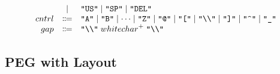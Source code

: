 \begin{align*}
\begin{array}{rcl}
    \\
    & \mid & \text{\texttt{\textquotedbl US\textquotedbl}}
    \mid \text{\texttt{\textquotedbl SP\textquotedbl}}
    \mid \text{\texttt{\textquotedbl DEL\textquotedbl}}
    \\
    {cntrl}
    & \Coloneq & \text{\texttt{\textquotedbl A\textquotedbl}} \mid \text{\texttt{\textquotedbl B\textquotedbl}} \mid \cdots \mid \text{\texttt{\textquotedbl Z\textquotedbl}}
    \mid \text{\texttt{\textquotedbl @\textquotedbl}}
    \mid \text{\texttt{\textquotedbl [\textquotedbl}}
    \mid \text{\texttt{\textquotedbl\textbackslash\textbackslash\textquotedbl}}
    \mid \text{\texttt{\textquotedbl ]\textquotedbl}}
    \mid \text{\texttt{\textquotedbl\textasciicircum\textquotedbl}}
    \mid \text{\texttt{\textquotedbl\textunderscore\textquotedbl}}
    \\
    {gap}
    & \Coloneq & \text{\texttt{\textquotedbl\textbackslash\textbackslash\textquotedbl}}\; {whitechar}^+\; \text{\texttt{\textquotedbl\textbackslash\textbackslash\textquotedbl}}
  \end{array}
\end{align*}

\subsection{PEG with Layout}


